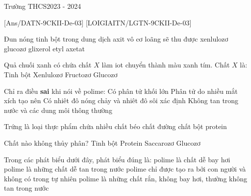 \begin{name}{Trường THCS}{2023 - 2024}
\end{name}
[Ans/DATN-9CKII-De-03]
{}[LOIGIAITN/LGTN-9CKII-De-03]
\begin{ex}
	Đun nóng tinh bột trong dung dịch axit vô cơ loãng sẽ thu được
	\choice
	{xenlulozơ}
	{\True glucozơ}
	{glixerol}
	{etyl axetat}
\end{ex}
\begin{ex}
	Quả chuối xanh có chứa chất $X$ làm iot chuyển thành màu xanh tím. Chất $X$ là:
	\choice
	{\True Tinh bột}
	{Xenlulozơ}
	{Fructozơ}
	{Glucozơ}
\end{ex}
\begin{ex}
	Chỉ ra điều \textbf{sai} khi nói về polime:
	\choice
	{Có phân tử khối lớn}
	{Phân tử do nhiều mắt xích tạo nên}
	{\True Có nhiêt đô nóng chảy và nhiêt đô sôi xác định}
	{Không tan trong nước và các dung môi thông thường}
\end{ex}
\begin{ex}
	Trứng là loại thực phẩm chứa nhiều
	\choice
	{chất béo}
	{chất đường}
	{chất bột}
	{\True protein}
\end{ex}
\begin{ex}
	Chất nào không thủy phân?
	\choice
	{Tinh bột}
	{Protein}
	{Saccarozơ}
	{\True Glucozơ}
\end{ex}
\begin{ex}
	Trong các phát biểu dưới đây, phát biểu đúng là:
	\choice
	{polime là chất dễ bay hơi}
	{polime là những chất dễ tan trong nước}
	{polime chỉ được tạo ra bởi con người và không có trong tự nhiên}
	{\True polime là những chất rắn, không bay hơi, thường không tan trong nước}
\end{ex}
